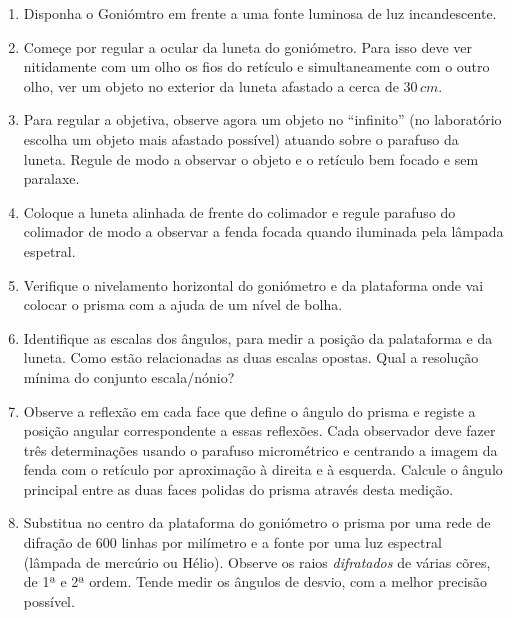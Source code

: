 \documentclass[a4paper,12pt]{article}      %
\begin{document}
\begin{enumerate}
\item Disponha o Goniómtro em frente a uma fonte luminosa de luz incandescente.
\item Começe por regular a ocular da luneta do goniómetro. Para isso deve ver nitidamente com um 
olho  os fios do retículo e simultaneamente com o outro olho, ver um objeto no exterior da luneta afastado a cerca de 
$30\,cm$.  
\item Para  regular  a  objetiva,  observe  agora  um  objeto  no  “infinito” (no  laboratório 
escolha  um objeto  mais  afastado possível)  atuando  sobre  o  parafuso  da  luneta.  Regule  de  modo  a 
observar o objeto e o retículo bem focado e sem paralaxe. 
\item Coloque  a  luneta  alinhada de frente  do  colimador  e  regule  parafuso  do 
colimador de modo a observar a fenda focada quando iluminada pela lâmpada espetral. 
\item Verifique o nivelamento horizontal do goniómetro e da plataforma onde vai colocar o prisma com a ajuda de um nível de bolha. 
\item Identifique as escalas dos ângulos, para medir a posição da palataforma e da luneta. Como estão relacionadas as duas escalas opostas. Qual a resolução mínima do conjunto escala/nónio?
\item Observe a reflexão em cada face que define o ângulo do prisma e registe a posição angular 
correspondente a essas reflexões. Cada observador deve fazer três determinações usando o 
parafuso  micrométrico e centrando  a  imagem  da  fenda  com  o retículo  por  aproximação  à direita e à esquerda. Calcule o ângulo principal entre as duas faces polidas do prisma através desta medição.
\item Substitua no centro da plataforma do goniómetro o prisma por uma rede de difração de 
600 linhas por milímetro e a fonte por uma luz espectral (lâmpada de mercúrio ou Hélio). Observe os raios \emph{difratados} de várias cõres, de 1ª e 2ª ordem. Tende medir os ângulos de desvio, com a melhor precisão possível.

\end{enumerate}


	
\newpage
\def\width{18}
\def\hauteur{25}
\end{document}
